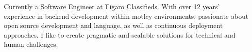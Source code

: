 

\begin{cvparagraph}

Currently a Software Engineer at Figaro Classifieds.\newline
With over 12 years’ experience in backend development within motley environments, passionate about
open source development and language, as well as continuous deployment approaches.
I like to create pragmatic and scalable solutions for technical and human challenges.
\end{cvparagraph}
